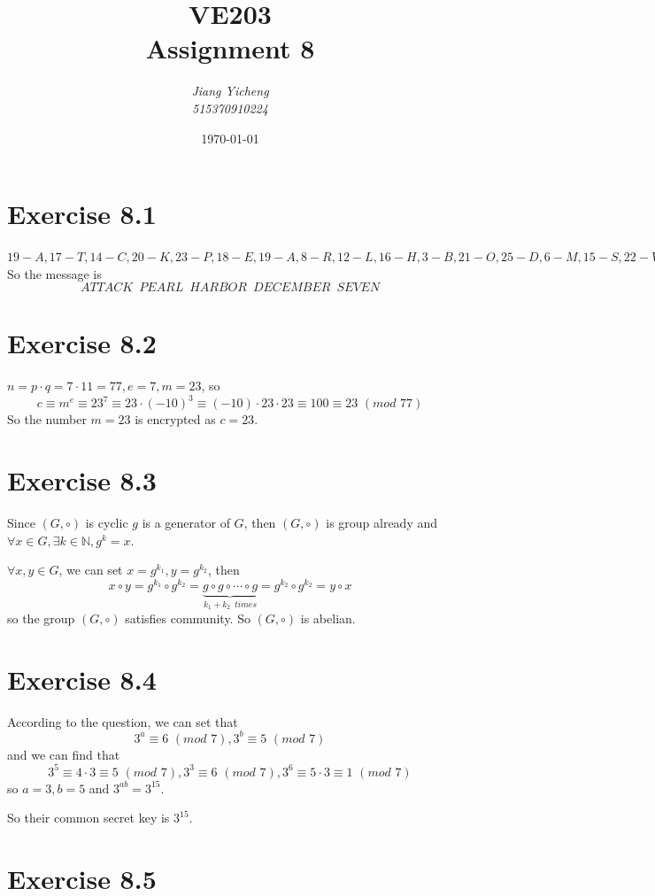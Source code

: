 \documentclass[a4paper,12pt,titlepage]{article}
\author{\textit{Jiang Yicheng}\\\textit{515370910224}}
\title{\textbf{VE203\\
		Assignment 8}}
\date{\today}
\begin{document}
\maketitle

\section*{Exercise 8.1} 
$19-A,17-T,14-C,20-K,23-P,18-E,19-A,8-R,12-L,16-H,3-B,21-O,25-D,6-M,15-S,22-V,11-N$
So the message is
$$ATTACK\,\,\,PEARL\,\,\,HARBOR\,\,\,DECEMBER\,\,\,SEVEN$$
\section*{Exercise 8.2} 
$n=p\cdot q=7\cdot 11=77,e=7,m=23$, so
$$c\equiv m^e\equiv 23^7\equiv23\cdot(-10)^3\equiv (-10)\cdot 23\cdot23\equiv 100\equiv23\,\,(mod\,\,77)$$
So the number $m=23$ is encrypted as $c=23$.
\section*{Exercise 8.3}
Since $(G,\circ)$ is cyclic $g$ is a generator of $G$, then $(G,\circ)$ is group already and $\forall x\in G,\exists k\in \mathbb{N},g^k=x$.

$\forall x,y\in G$, we can set $x=g^{k_1},y=g^{k_2}$, then 
$$x\circ y=g^{k_1}\circ g^{k_2}=\underbrace{g\circ g\circ\cdots\circ g}_{k_1+k_2\,\,\,times}=g^{k_2}\circ g^{k_2}=y\circ x$$
so the group $(G,\circ)$ satisfies community. So $(G,\circ)$ is abelian.
\section*{Exercise 8.4}
According to the question, we can set that
$$3^{a}\equiv 6\,\,(mod\,\,7),3^{b}\equiv 5\,\,(mod\,\,7)$$
and we can find that
$$3^5\equiv 4\cdot3\equiv5\,\,(mod\,\,7), 3^3\equiv6\,\,(mod\,\,7),3^6\equiv 5\cdot 3\equiv1\,\,(mod\,\,7)$$
so $a=3,b=5$ and $3^{ab}=3^{15}$.

So their common secret key is $3^{15}$.


\section*{Exercise 8.5}
\end{document}
